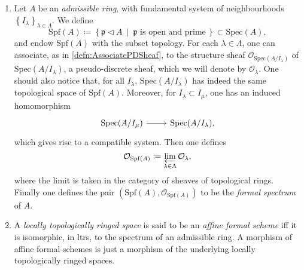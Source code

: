 \documentclass[../Main]{subfiles}
\begin{document}
\begin{defn}\leavevmode\vspace{-\baselineskip}
\begin{enumerate}
\item Let $A$ be an {\em admissible ring}, with fundamental system of
	neighbourhoods $\left\{ I_\lambda \right\}_{\lambda \in \Lambda}$.
	We define
	\begin{equation*}
	\mathrm{Spf}(A) \coloneqq
	\left\{ \mathfrak{p} \triangleleft A \ \middle|\ \mathfrak{p}
	\text{ is open and prime}\, \right\} \subset \mathrm{Spec}(A)
	,\end{equation*}
	and endow $\mathrm{Spf}(A)$ with the subset topology.
	For each $\lambda \in \Lambda$, one can associate,
	as in \cref{defn:AssociatePDSheaf},
	to the structure sheaf $\mathcal{O}_{\mathrm{Spec}(A/I_\lambda)}$
	of $\mathrm{Spec}(A/I_\lambda)$,
	a pseudo-discrete sheaf, which we will denote by $\mathcal{O}_\lambda$.
	One should also notice that, for all $I_\lambda$,
	$\mathrm{Spec}(A/I_\lambda)$ has indeed the same topological space
	of $\mathrm{Spf}(A)$.
	Moreover, for $I_\lambda \subset I_\mu$, one has an induced homomorphism
	\begin{equation*}
	\begin{tikzcd}[row sep = 0ex
		,/tikz/column 1/.append style={anchor=base east}
		,/tikz/column 2/.append style={anchor=base west}]
		\mathrm{Spec}(A/I_\mu) \arrow[r, "", rightarrow] &
		\mathrm{Spec}(A/I_\lambda)
	,\end{tikzcd}
	\end{equation*} 
	which gives rise to a compatible system.
	Then one defines
	\begin{equation*}
	\mathcal{O}_{\mathrm{Spf}(A)} \coloneqq
	\varprojlim_{\lambda \in \Lambda} \mathcal{O}_\lambda
	,\end{equation*}
	where the limit is taken in the category of sheaves of topological rings.
	Finally one defines the pair $( \mathrm{Spf}(A) , \mathcal{O}_{ \mathrm{Spf}(A) } )$
	to be the {\em formal spectrum} of $A$.

\item A {\em locally topologically ringed space} is said to be an 
	{\em affine formal scheme} iff it is isomorphic,
	in ltrs, to the spectrum of an admissible ring.
	A morphism of affine formal schemes is just a morphism of the underlying
	locally topologically ringed spaces.
\end{enumerate}
\end{defn}
\end{document}
